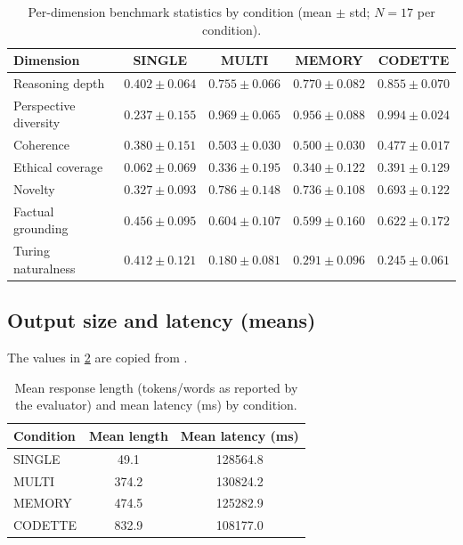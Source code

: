 \documentclass[11pt,a4paper]{article}
\begin{document}
\begin{table}[ht]
\centering
\caption{Per-dimension benchmark statistics by condition (mean $\pm$ std; $N=17$ per condition).}
\label{tab:dimension-means-std}
\begin{tabular}{lcccc}
\toprule
\textbf{Dimension} & \textbf{SINGLE} & \textbf{MULTI} & \textbf{MEMORY} & \textbf{CODETTE} \\
\midrule
Reasoning depth        & $0.402\pm0.064$ & $0.755\pm0.066$ & $0.770\pm0.082$ & $0.855\pm0.070$ \\
Perspective diversity  & $0.237\pm0.155$ & $0.969\pm0.065$ & $0.956\pm0.088$ & $0.994\pm0.024$ \\
Coherence              & $0.380\pm0.151$ & $0.503\pm0.030$ & $0.500\pm0.030$ & $0.477\pm0.017$ \\
Ethical coverage       & $0.062\pm0.069$ & $0.336\pm0.195$ & $0.340\pm0.122$ & $0.391\pm0.129$ \\
Novelty                & $0.327\pm0.093$ & $0.786\pm0.148$ & $0.736\pm0.108$ & $0.693\pm0.122$ \\
Factual grounding      & $0.456\pm0.095$ & $0.604\pm0.107$ & $0.599\pm0.160$ & $0.622\pm0.172$ \\
Turing naturalness     & $0.412\pm0.121$ & $0.180\pm0.081$ & $0.291\pm0.096$ & $0.245\pm0.061$ \\
\bottomrule
\end{tabular}
\end{table}

\subsection{Output size and latency (means)}
\label{app:length-latency}

The values in \cref{tab:length-latency} are copied from .

\begin{table}[ht]
\centering
\caption{Mean response length (tokens/words as reported by the evaluator) and mean latency (ms) by condition.}
\label{tab:length-latency}
\begin{tabular}{lcc}
\toprule
\textbf{Condition} & \textbf{Mean length} & \textbf{Mean latency (ms)} \\
\midrule
SINGLE  & 49.1  & 128564.8 \\
MULTI   & 374.2 & 130824.2 \\
MEMORY  & 474.5 & 125282.9 \\
CODETTE & 832.9 & 108177.0 \\
\bottomrule
\end{tabular}
\end{table}
\end{document}
